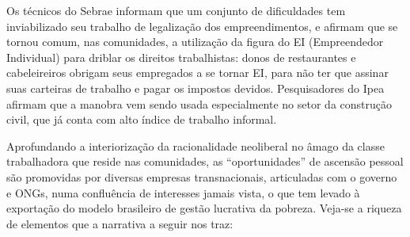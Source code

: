 Os técnicos do Sebrae informam que um conjunto de dificuldades tem
inviabilizado seu trabalho de legalização dos empreendimentos, e afirmam
que se tornou comum, nas comunidades, a utilização da figura do EI
(Empreendedor Individual) para driblar os direitos trabalhistas: donos
de restaurantes e cabeleireiros obrigam seus empregados a se tornar EI,
para não ter que assinar suas carteiras de trabalho e pagar os impostos
devidos. Pesquisadores do Ipea afirmam que a manobra vem sendo usada
especialmente no setor da construção civil, que já conta com alto índice
de trabalho informal.

Aprofundando a interiorização da racionalidade neoliberal no âmago da
classe trabalhadora que reside nas comunidades, as ``oportunidades'' de
ascensão pessoal são promovidas por diversas empresas transnacionais,
articuladas com o governo e ONGs, numa confluência de interesses jamais
vista, o que tem levado à exportação do modelo brasileiro de gestão
lucrativa da pobreza. Veja-se a riqueza de elementos que a narrativa a
seguir nos traz:

